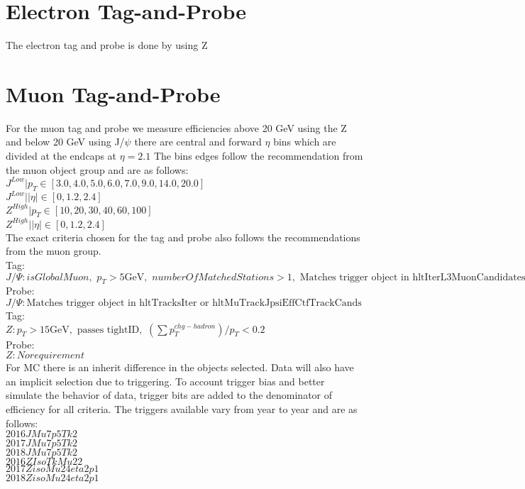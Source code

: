 \section{Electron Tag-and-Probe }

The electron tag and probe is done by using Z

\section{Muon Tag-and-Probe}

For the muon tag and probe we measure efficiencies above 20 GeV using the Z and below 20 GeV using J/$\psi$ there are central and forward $\eta$ bins which are divided at the endcaps at $\eta = 2.1$ The bins edges follow the recommendation from the muon object group and are as follows:\\
$J^{Low}  | p_T \in [3.0, 4.0,  5.0, 6.0, 7.0, 9.0, 14.0,  20.0]$\\
$J^{Low}  | |\eta| \in [0, 1.2, 2.4]$\\
$Z^{High} | p_T \in [10, 20, 30, 40, 60, 100]$\\
$Z^{High} | |\eta| \in [ 0, 1.2, 2.4]$\\
The exact criteria chosen for the tag and probe also follows the recommendations from the muon group.\\
Tag:\\
$J/\Psi: isGlobalMuon, \, \, p_T>5 \text{GeV} , \, \, numberOfMatchedStations > 1, \,\, \text{Matches trigger object in hltIterL3MuonCandidates}$\\
Probe:\\
$J/\Psi: \text{Matches trigger object in hltTracksIter or hltMuTrackJpsiEffCtfTrackCands}$\\

Tag:\\
$Z: p_T>15 \text{GeV}, \, \, \text{passes tightID}, \, \, (\sum p_T^{chg-hadron})/p_T < 0.2$\\
Probe:\\
$Z: No requirement$\\

For MC there is an inherit difference in the objects selected. Data will also have an implicit selection due to triggering. To account trigger bias and better simulate the behavior of data, trigger bits are added to the denominator of efficiency for all criteria. The triggers available vary from year to year and are as follows:\\

$2016 J Mu7p5Tk2$\\
$2017 J Mu7p5Tk2$\\
$2018 J Mu7p5Tk2$\\
$2016 Z IsoTkMu22$\\
$2017 Z isoMu24eta2p1$\\
$2018 Z isoMu24eta2p1$\\


